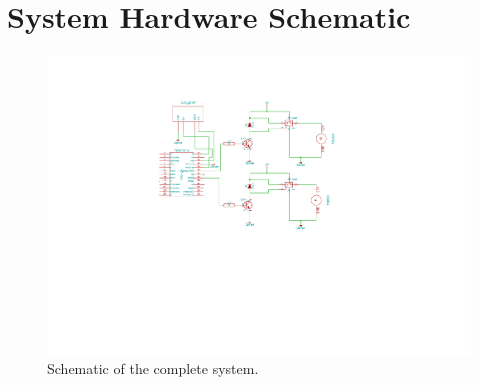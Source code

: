 \chapter{System Hardware Schematic}
\label{app:d}

\begin{figure}
 \centering 
 \includegraphics[clip=true, trim = 230 250 0 90,
 scale=1.4]{system_schem}
 \caption{Schematic of the complete system.}
 \label{fig:hardware_schem}
\end{figure}